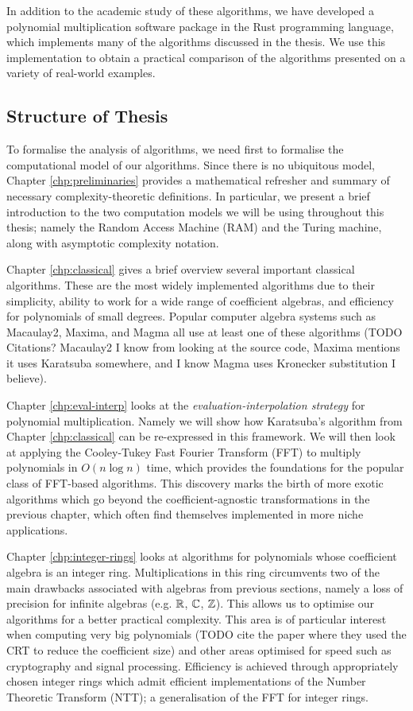 In addition to the academic study of these algorithms, we have developed a polynomial multiplication software package in the Rust programming language, which implements many of the algorithms discussed in the thesis. We use this implementation to obtain a practical comparison of the algorithms presented on a variety of real-world examples.

\subsection{Structure of Thesis}
\label{sub:Structure-of-Thesis}

To formalise the analysis of algorithms, we need first to formalise the computational model of our algorithms. Since there is no ubiquitous model, Chapter \ref{chp:preliminaries} provides a mathematical refresher and summary of necessary complexity-theoretic definitions. In particular, we present a brief introduction to the two computation models we will be using throughout this thesis; namely the Random Access Machine (RAM) and the Turing machine, along with asymptotic complexity notation.

Chapter \ref{chp:classical} gives a brief overview several important classical algorithms. These are the most widely implemented algorithms due to their simplicity, ability to work for a wide range of coefficient algebras, and efficiency for polynomials of small degrees. Popular computer algebra systems such as Macaulay2, Maxima, and Magma all use at least one of these algorithms (TODO Citations? Macaulay2 I know from looking at the source code, Maxima mentions it uses Karatsuba somewhere, and I know Magma uses Kronecker substitution I believe).

Chapter \ref{chp:eval-interp} looks at the \emph{evaluation-interpolation strategy} for polynomial multiplication. Namely we will show how Karatsuba's algorithm from Chapter \ref{chp:classical} can be re-expressed in this framework. We will then look at applying the Cooley-Tukey Fast Fourier Transform (FFT) to multiply polynomials in $O(n \log n)$ time, which provides the foundations for the popular class of FFT-based algorithms. This discovery marks the birth of more exotic algorithms which go beyond the coefficient-agnostic transformations in the previous chapter, which often find themselves implemented in more niche applications.

Chapter \ref{chp:integer-rings} looks at algorithms for polynomials whose coefficient algebra is an integer ring. Multiplications in this ring circumvents two of the main drawbacks associated with algebras from previous sections, namely a loss of precision for infinite algebras (e.g. ${\mathbb R}$, ${\mathbb C}$, ${\mathbb Z}$). This allows us to optimise our algorithms for a better practical complexity. This area is of particular interest when computing very big polynomials (TODO cite the paper where they used the CRT to reduce the coefficient size) and other areas optimised for speed such as cryptography and signal processing. Efficiency is achieved through appropriately chosen integer rings which admit efficient implementations of the Number Theoretic Transform (NTT); a generalisation of the FFT for integer rings.

